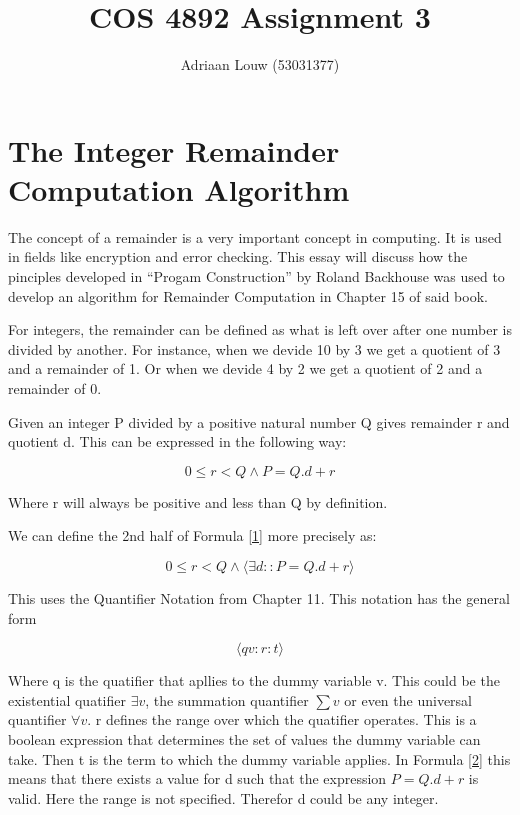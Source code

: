\documentclass[10pt,a4paper]{article}
\title{COS 4892 Assignment 3}
\author{Adriaan Louw (53031377)}
\begin{document}
\maketitle

\section{The Integer Remainder Computation Algorithm}

The concept of a remainder is a very important concept in computing. It is used in fields like encryption and error checking. This essay will discuss how the pinciples developed in ``Progam Construction'' by Roland Backhouse was used to develop an algorithm for Remainder Computation in Chapter 15 of said book.

For integers, the remainder can be defined as what is left over after one number is divided by another. For instance, when we devide 10 by 3 we get a quotient of 3 and a remainder of 1. Or when we devide 4 by 2 we get a quotient of 2 and a remainder of 0. 

Given an integer P divided by a positive natural number Q gives remainder r and quotient d. This can be expressed in the following way:

\begin{equation}
\label{1}
 0\le r < Q \wedge P = Q.d +r
\end{equation}

Where r will always be positive and less than Q by definition.

We can define the 2nd half of Formula \ref{1} more precisely as:

\begin{equation}
\label{2}
 0\le r < Q \wedge \langle \exists d::P = Q.d +r\rangle 
\end{equation}

This uses the Quantifier Notation from Chapter 11. This notation has the general form 

\begin{equation}
 \langle q v :r:t \rangle
\end{equation}

Where q is the quatifier that apllies to the dummy variable v. This could be the existential quatifier $\exists v$, the summation quantifier $\sum v$ or even the universal quantifier $\forall v$. r defines the range over which the quatifier operates. This is a boolean expression that determines the set of values the dummy variable  can take. Then t is the term to which the dummy variable applies. In Formula \ref{2} this means that there exists a value for d such that the expression $P = Q.d + r$ is valid. Here the range is not specified. Therefor d could be any integer.
\end{document}

